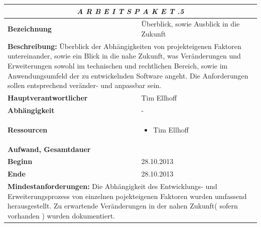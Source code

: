 \documentclass[fontsize=12pt,paper=a4,twoside]{scrartcl}
\begin{document}
\begin{tabular}{p{7.5cm}|p{7.5cm}}\toprule
\multicolumn{2}{c}{\textbf{\textit{A R B E I T S P A K E T \quad 2.2.5}}} \\ \toprule \hline
\textbf{Bezeichnung} & Überblick, sowie Ausblick in die Zukunft  \\\hline
\multicolumn{2}{p{15cm}}{\textbf{Beschreibung:} \newline 
Überblick der Abhängigkeiten von projekteigenen Faktoren untereinander, sowie ein Blick in die nahe Zukunft, was  Veränderungen und Erweiterungen sowohl im technischen und rechtlichen Bereich, sowie im Anwendungsumfeld der zu entwickelnden Software angeht. Die Anforderungen sollen entsprechend veränder- und anpassbar sein.}  \\\hline
\textbf{Hauptverantwortlicher} & Tim Ellhoff \\\hline
\textbf{Abhängigkeit} & -\\\hline
\textbf{Ressourcen} & \begin{itemize} 
\itemsep0pt
\item Tim Ellhoff
\end{itemize} \\\hline
\textbf{Aufwand, Gesamtdauer} & \\\hline
\textbf{Beginn} & 28.10.2013 \\\hline
\textbf{Ende} & 28.10.2013\\\hline
\multicolumn{2}{p{15cm}}{\textbf{Mindestanforderungen: } \newline
Die Abhängigkeit des Entwicklungs- und Erweiterungsprozess
von einzelnen pojekteigenen Faktoren wurden umfassend herausgestellt. Zu erwartende Veränderungen in der nahen Zukunft( sofern vorhanden ) wurden dokumentiert. }  \\ \toprule
\end{tabular} \\\\
\end{document}
